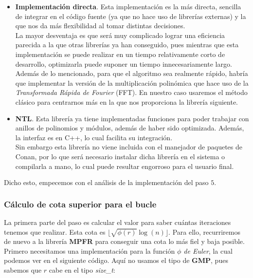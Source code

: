 \begin{itemize}
	\item \textbf{Implementación directa}. Esta implementación es la más directa, sencilla de integrar en el código fuente (ya que no hace uso de librerías externas) y la que nos da más flexibilidad al tomar distintas decisiones.\\
	
	La mayor desventaja es que será muy complicado lograr una eficiencia parecida a la que otras librerías ya han conseguido, pues mientras que esta implementación se puede realizar en un tiempo relativamente corto de desarrollo, optimizarla puede suponer un tiempo innecesariamente largo.\\
	
	Además de lo mencionado, para que el algoritmo sea realmente rápido, habría que implementar la versión de la multiplicación polinómica que hace uso de la \textit{Transformada Rápida de Fourier} (FFT). En nuestro caso usaremos el método clásico para centrarnos más en la que nos proporciona la librería siguiente.
	
	\item \textbf{NTL}. Esta librería ya tiene implementadas funciones para poder trabajar con anillos de polinomios y módulos, además de haber sido optimizada. Además, la interfaz es en C++, lo cual facilita su integración.\\
	
	Sin embargo esta librería no viene incluida con el manejador de paquetes de Conan, por lo que será necesario instalar dicha librería en el sistema o compilarla a mano, lo cual puede resultar engorroso para el usuario final.
\end{itemize}

Dicho esto, empecemos con el análisis de la implementación del paso $5$.

\subsubsection{Cálculo de cota superior para el bucle}

La primera parte del paso es calcular el valor para saber cuántas iteraciones tenemos que realizar. Esta cota es $\lfloor \sqrt{\phi(r)}\log(n) \rfloor$. Para ello, recurriremos de nuevo a la librería \textbf{MPFR} para conseguir una cota lo más fiel y baja posible.\\

Primero necesitamos una implementación para la función \textit{$\phi$ de Euler}, la cual podemos ver en el siguiente código. Aquí no usamos el tipo de \textbf{GMP}, pues sabemos que $r$ cabe en el tipo \textit{size\_t}:\\

